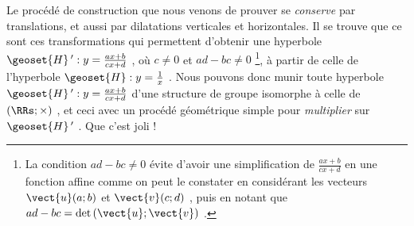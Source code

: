 Le procédé de construction que nous venons de prouver se \emph{\og conserve \fg} par translations, et aussi par dilatations verticales et horizontales.
Il se trouve que ce sont ces transformations qui permettent d'obtenir une hyperbole $\geoset{H}\,^\prime : y = \frac{a x + b}{c x + d}$ , où $c \neq 0$ et $ad - bc \neq 0$ 
\footnote{
	La condition $ad - bc \neq 0$ évite d'avoir une simplification de $\frac{a x + b}{c x + d}$ en une fonction affine comme on peut le constater en considérant les vecteurs $\vect{u}(a ; b)$ et $\vect{v}(c ; d)$ , puis en notant que $ad - bc = \det \left( \vect{u} ; \vect{v} \right)$ .  
},
à partir de celle de l'hyperbole $\geoset{H} : y = \frac{1}{x}$ .
Nous pouvons donc munir toute hyperbole $\geoset{H}\,^\prime : y = \frac{a x + b}{c x + d}$ d'une structure de groupe isomorphe à celle de $(\RRs ; \times)$ , et ceci avec un procédé géométrique simple pour \emph{\og multiplier \fg} sur $\geoset{H}\,^\prime$ . Que c'est joli !

